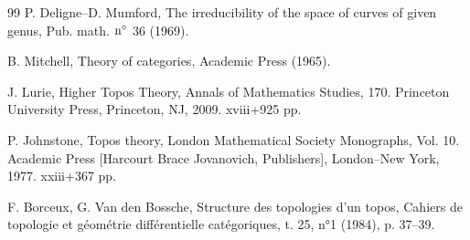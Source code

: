 \begin{thebibliography}{99}
 P. Deligne--D. Mumford, The irreducibility of
the space of curves of given genus, Pub. math. ${\rm n^{\circ}}$ 36
(1969).

 B. Mitchell, Theory of categories, Academic Press
(1965).

 J. Lurie, Higher Topos Theory, Annals of Mathematics Studies, 170. Princeton University Press,
Princeton, NJ, 2009. xviii+925 pp.

 P. Johnstone, Topos theory,
London Mathematical Society Monographs, Vol. 10.
Academic Press [Harcourt Brace Jovanovich, Publishers], London--New York, 1977. xxiii+367 pp.

 F. Borceux, G. Van den Bossche, Structure des topologies
d'un topos, Cahiers de topologie et géométrie différentielle catégoriques,
t. 25, n°1 (1984), p. 37--39.

\end{thebibliography}

\ifx\danslelivre\undefined

\fi




